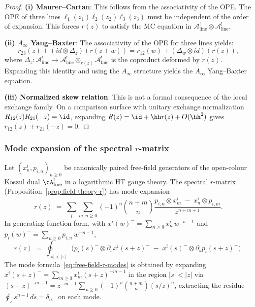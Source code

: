 \begin{proof}
\textbf{(i) Maurer--Cartan}: This follows from the associativity of the OPE. The OPE of three lines $\ell_1(z_1) \ell_2(z_2) \ell_3(z_3)$ must be independent of the order of expansion. This forces $r(z)$ to satisfy the MC equation in $\mathcal{A}^!_{\mathrm{line}} \otimes \mathcal{A}^!_{\mathrm{line}}$.

\textbf{(ii) $A_\infty$ Yang--Baxter}: The associativity of the OPE for three lines yields:
\begin{equation}
r_{23}(z) + (id \otimes \Delta_z)(r(z+w)) = r_{12}(w) + (\Delta_w \otimes id)(r(z)),
\end{equation}
where $\Delta_z : \mathcal{A}^!_{\mathrm{line}} \to \mathcal{A}^!_{\mathrm{line}} \otimes_{r(z)} \mathcal{A}^!_{\mathrm{line}}$ is the coproduct deformed by $r(z)$. Expanding this identity and using the $A_\infty$ structure yields the $A_\infty$ Yang--Baxter equation.

\textbf{(iii) Normalized skew relation}: This is not a formal
consequence of the local exchange family.  On a comparison surface with
unitary exchange normalization \(R_{12}(z)R_{21}(-z)=\id\), expanding
\(R(z)=\id+\hh r(z)+O(\hh^2)\) gives
\(r_{12}(z)+r_{21}(-z)=0\).
\end{proof}

\subsubsection{Mode expansion of the spectral $r$-matrix}
\label{subsubsec:mode-expansion-r}

\begin{proposition}
\label{prop:free-field-r-mode}
Let $(x^i_n, p_{i,n})_{n \ge 0}$ be canonically paired free-field
generators of the open-colour Koszul dual $\cA^!_{\mathrm{line}}$
in a logarithmic HT gauge theory. The spectral $r$-matrix
\textup{(}Proposition~\textup{\ref{prop:field-theory-r}}\textup{)}
has mode expansion
\begin{equation}\label{eq:free-field-r-modes}
 r(z) \;=\; \sum_i \sum_{m,n \ge 0}
 (-1)^n \binom{n+m}{n}
 \frac{p_{i,n} \otimes x^i_m \;-\; x^i_n \otimes p_{i,m}}
 {z^{n+m+1}}.
\end{equation}
In generating-function form, with
$x^i(w)^- = \sum_{n \ge 0} x^i_n\, w^{-n-1}$
and $p_i(w)^- = \sum_{n \ge 0} p_{i,n}\, w^{-n-1}$,
\begin{equation}\label{eq:free-field-r-gf}
 r(z) \;=\; \oint_{|s| < |z|}
 \bigl(
 p_i(s)^- \otimes \partial_s x^i(s+z)^-
 \;-\; x^i(s)^- \otimes \partial_s p_i(s+z)^-
 \bigr).
\end{equation}
The mode formula~\eqref{eq:free-field-r-modes} is obtained by
expanding $x^i(s+z)^- = \sum_{m \ge 0} x^i_m (s+z)^{-m-1}$
in the region $|s| < |z|$ via
$(s+z)^{-m-1} = z^{-m-1}\sum_{n \ge 0} (-1)^n \binom{n+m}{n}
(s/z)^n$,
extracting the residue $\oint_s s^{n-1}\, ds = \delta_{n,\cdot}$
on each mode.
\end{proposition}

